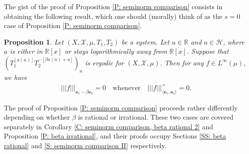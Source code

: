 \documentclass[11pt]{amsart}
\newtheorem{proposition}[lemma]{Proposition}
\theoremstyle{definition}
\newcommand{\R}{{\mathbb R}}
\newcommand{\CH}{{\mathcal H}}
\newcommand{\CX}{{\mathcal X}}
\newcommand{\be}{{\mathbf{e}}}
\newcommand{\nnorm}[1]{\lvert\!|\!| #1|\!|\!\rvert}
\newcommand{\1}{{\mathbf{1}}}
\newcommand{\floor}[1]{{\left \lfloor #1 \right \rfloor}}
\begin{document}
The gist of the proof of Proposition \ref{P: seminorm comparison} consists in obtaining the following result, which one should (morally) think of as the $s=0$ case of Proposition \ref{P: seminorm comparison}.
\begin{proposition}\label{P: seminorm comparison, s = 0}
    Let $(X, \CX, \mu, T_1, T_2)$ be a system.
    Let $u\in\R$ and $a\in\CH$, where $a$ is either in $\R[x]$ or stays logarithmically away from $\R[x]$.
    Suppose that $(T_1^{\floor{a(n)}}T_2^{-\floor{\beta a(n)+u}})_n$ is ergodic for $(X, \CX, \mu)$. Then for any $f\in L^\infty(\mu)$, we have
    \begin{align*}
        \nnorm{f}_{\be_1 - \beta \be_2} = 0 \quad \textrm{whenever} \quad \nnorm{f}_{\langle\be_1, \be_2\rangle}^+ = 0.
    \end{align*}
\end{proposition}

The proof of Proposition \ref{P: seminorm comparison} proceeds rather differently depending on whether $\beta$ is rational or irrational. These two cases are covered separately in Corollary \ref{C: seminorm comparison, beta rational 2} and Proposition \ref{P: beta irrational}, and their proofs occupy Sections \ref{SS: beta rational} and \ref{S: seminorm comparison II} respectively.
\end{document}
